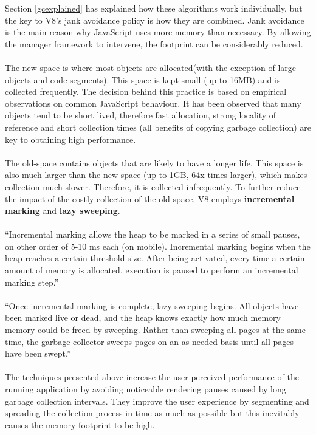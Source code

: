 \documentclass{l4proj}
\begin{document}
Section \ref{gcexplained} has explained how these algorithms work individually, but the key to V8's jank avoidance policy is how they are combined. Jank avoidance is the main reason why JavaScript uses more memory than necessary. By allowing the manager framework to intervene, the footprint can be considerably reduced. 
\\\\
\hspace*{3em} The new-space is where most objects are allocated(with the exception of large objects and code segments). This space is kept small (up to 16MB) and is collected frequently. The decision behind this practice is based on empirical observations on common JavaScript behaviour. It has been observed that many objects tend to be short lived, therefore fast allocation, strong locality of reference and short collection times (all benefits of copying garbage collection) are key to obtaining high performance.    
\\\\
\hspace*{3em} The old-space contains objects that are likely to have a longer life. This space is also much larger than the new-space (up to 1GB, 64x times larger), which makes collection much slower. Therefore, it is collected infrequently. To further reduce the impact of the costly collection of the old-space, V8 employs \textbf{incremental marking} and \textbf{lazy sweeping}. 
\\\\
\label{lazyv8}
``Incremental marking allows the heap to be marked in a series of small pauses, on other order of 5-10 ms each (on mobile). Incremental marking begins when the heap reaches a certain threshold size. After being activated, every time a certain amount of memory is allocated, execution is paused to perform an incremental marking step.''\cite{v8gctour}
\\\\
``Once incremental marking is complete, lazy sweeping begins. All objects have been marked live or dead, and the heap knows exactly how much memory memory could be freed by sweeping. Rather than sweeping all pages at the same time, the garbage collector sweeps pages on an as-needed basis until all pages have been swept.''\cite{v8gctour}
\\\\
The techniques presented above increase the user perceived performance of the running application by avoiding noticeable rendering pauses caused by long garbage collection intervals. They improve the user experience by segmenting and spreading the collection process in time as much as possible but this inevitably causes the memory footprint to be high.
\end{document}
